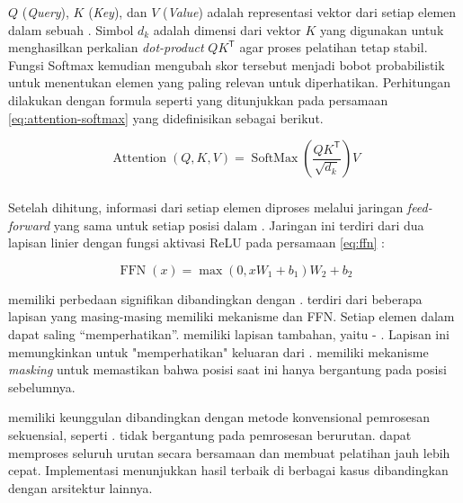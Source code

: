 $Q$ (\emph{Query}), $K$ (\emph{Key}), dan $V$ (\emph{Value}) adalah representasi vektor dari setiap elemen dalam sebuah \sequence. Simbol $d_k$ adalah dimensi dari vektor $K$ yang digunakan untuk menghasilkan perkalian \emph{dot-product} $QK^\mathsf{T}$ agar proses pelatihan tetap stabil. Fungsi Softmax kemudian mengubah skor tersebut menjadi bobot probabilistik untuk menentukan elemen yang paling relevan untuk diperhatikan.
\newpage
Perhitungan \attention{} dilakukan dengan formula seperti yang ditunjukkan pada persamaan \eqref{eq:attention-softmax} \parencite{vaswani2017attention} yang didefinisikan sebagai berikut.

\begin{equation}
	\label{eq:attention-softmax}
		\operatorname{Attention}(Q, K, V) = \operatorname{SoftMax}\left(\frac{QK^\mathsf{T}}{\sqrt{d_k}}\right)V
\end{equation}

\subsubsection{\ffnfull}
Setelah \attention{} dihitung, informasi dari setiap elemen diproses melalui jaringan \emph{feed-forward} yang sama untuk setiap posisi dalam \sequence. Jaringan ini terdiri dari dua lapisan linier dengan fungsi aktivasi ReLU pada persamaan \eqref{eq:ffn} \parencite{vaswani2017attention}:

\begin{equation}
	\label{eq:ffn}
	\operatorname{FFN}(x) = \max(0, xW_1 + b_1)W_2 + b_2
\end{equation}

\decoderfl{} memiliki perbedaan signifikan dibandingkan dengan \encoder. \encoderfl{} terdiri dari beberapa lapisan yang masing-masing memiliki mekanisme \selfattention{} dan FFN. Setiap elemen dalam \sequence{} dapat saling “memperhatikan”. \decoderfl{} memiliki lapisan tambahan, yaitu \encoder{}\--\decoder{} \attention. Lapisan ini memungkinkan \decoder{} untuk "memperhatikan" keluaran dari \encoder. \decoderfl{} memiliki mekanisme \emph{masking} untuk memastikan bahwa posisi saat ini hanya bergantung pada posisi sebelumnya.

\transformer{} memiliki keunggulan dibandingkan dengan metode konvensional pemrosesan sekuensial, seperti \rnn. \transformer{} tidak bergantung pada pemrosesan berurutan. \transformer{} dapat memproses seluruh urutan secara bersamaan dan membuat pelatihan jauh lebih cepat. Implementasi \transformer{} menunjukkan hasil terbaik di berbagai kasus dibandingkan dengan arsitektur lainnya.
